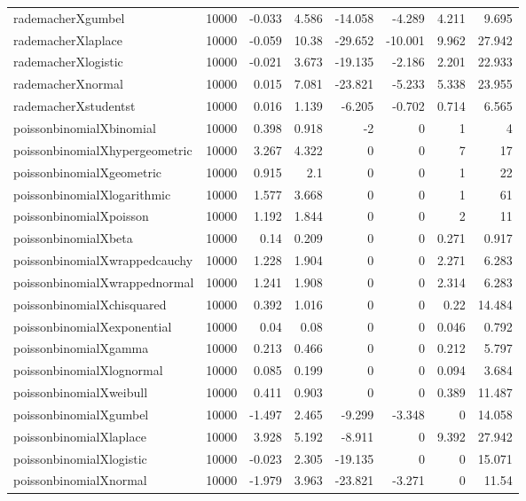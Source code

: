 \begin{table}[!htbp]
{\begin{tabular}{lrrrrrrr}
rademacherXgumbel & 10000 & -0.033 & 4.586 & -14.058 & -4.289 & 4.211 & 9.695 \\ 
rademacherXlaplace & 10000 & -0.059 & 10.38 & -29.652 & -10.001 & 9.962 & 27.942 \\ 
rademacherXlogistic & 10000 & -0.021 & 3.673 & -19.135 & -2.186 & 2.201 & 22.933 \\ 
rademacherXnormal & 10000 & 0.015 & 7.081 & -23.821 & -5.233 & 5.338 & 23.955 \\ 
rademacherXstudentst & 10000 & 0.016 & 1.139 & -6.205 & -0.702 & 0.714 & 6.565 \\ 
poissonbinomialXbinomial & 10000 & 0.398 & 0.918 & -2 & 0 & 1 & 4 \\ 
poissonbinomialXhypergeometric & 10000 & 3.267 & 4.322 & 0 & 0 & 7 & 17 \\ 
poissonbinomialXgeometric & 10000 & 0.915 & 2.1 & 0 & 0 & 1 & 22 \\ 
poissonbinomialXlogarithmic & 10000 & 1.577 & 3.668 & 0 & 0 & 1 & 61 \\ 
poissonbinomialXpoisson & 10000 & 1.192 & 1.844 & 0 & 0 & 2 & 11 \\ 
poissonbinomialXbeta & 10000 & 0.14 & 0.209 & 0 & 0 & 0.271 & 0.917 \\ 
poissonbinomialXwrappedcauchy & 10000 & 1.228 & 1.904 & 0 & 0 & 2.271 & 6.283 \\ 
poissonbinomialXwrappednormal & 10000 & 1.241 & 1.908 & 0 & 0 & 2.314 & 6.283 \\ 
poissonbinomialXchisquared & 10000 & 0.392 & 1.016 & 0 & 0 & 0.22 & 14.484 \\ 
poissonbinomialXexponential & 10000 & 0.04 & 0.08 & 0 & 0 & 0.046 & 0.792 \\ 
poissonbinomialXgamma & 10000 & 0.213 & 0.466 & 0 & 0 & 0.212 & 5.797 \\ 
poissonbinomialXlognormal & 10000 & 0.085 & 0.199 & 0 & 0 & 0.094 & 3.684 \\ 
poissonbinomialXweibull & 10000 & 0.411 & 0.903 & 0 & 0 & 0.389 & 11.487 \\ 
poissonbinomialXgumbel & 10000 & -1.497 & 2.465 & -9.299 & -3.348 & 0 & 14.058 \\ 
poissonbinomialXlaplace & 10000 & 3.928 & 5.192 & -8.911 & 0 & 9.392 & 27.942 \\ 
poissonbinomialXlogistic & 10000 & -0.023 & 2.305 & -19.135 & 0 & 0 & 15.071 \\ 
poissonbinomialXnormal & 10000 & -1.979 & 3.963 & -23.821 & -3.271 & 0 & 11.54 \\ 

\end{tabular}}
\end{table}
